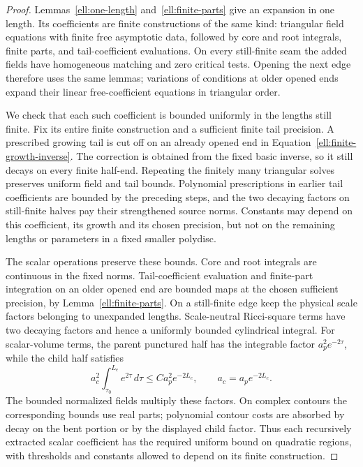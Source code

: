 \begin{proof}
Lemmas~\ref{ell:one-length} and~\ref{ell:finite-parts} give an
expansion in one length. Its coefficients are finite constructions
of the same kind: triangular field equations with finite free
asymptotic data, followed by core and root integrals, finite parts,
and tail-coefficient evaluations. On every still-finite seam the
added fields have homogeneous matching and zero critical tests.
Opening the next edge therefore uses the same lemmas; variations
of conditions at older opened ends expand their linear free-coefficient
equations in triangular order.

We check that each such coefficient is bounded uniformly in the
lengths still finite. Fix its entire finite construction and a
sufficient finite tail precision. A prescribed growing tail is cut
off on an already opened end in
Equation~\eqref{ell:finite-growth-inverse}. The correction is obtained
from the fixed basic inverse, so it still decays on every finite
half-end. Repeating the finitely many triangular solves preserves
uniform field and tail bounds. Polynomial prescriptions in earlier
tail coefficients are bounded by the preceding steps, and the two
decaying factors on still-finite halves pay their strengthened source
norms. Constants may depend on this coefficient, its growth and its
chosen precision, but not on the remaining lengths or parameters
in a fixed smaller polydisc.

The scalar operations preserve these bounds. Core and root integrals
are continuous in the fixed norms. Tail-coefficient evaluation and
finite-part integration on an older opened end are bounded maps at
the chosen sufficient precision, by Lemma~\ref{ell:finite-parts}.
On a still-finite edge keep the physical scale factors belonging to
unexpanded lengths. Scale-neutral Ricci-square terms have two
decaying factors and hence a uniformly bounded cylindrical integral.
For scalar-volume terms, the parent punctured half has the integrable
factor $a_p^2e^{-2\tau}$, while the child half satisfies
\[
 a_c^2\int_{\tau_0}^{L_e}e^{2\tau}\,d\tau
 \le C a_p^2e^{-2L_e},\qquad a_c=a_pe^{-2L_e}.
\]
The bounded normalized fields multiply these factors. On complex
contours the corresponding bounds use real parts; polynomial contour
costs are absorbed by decay on the bent portion or by the displayed
child factor. Thus each recursively extracted scalar coefficient
has the required uniform bound on quadratic regions, with thresholds
and constants allowed to depend on its finite construction.


\end{proof}
